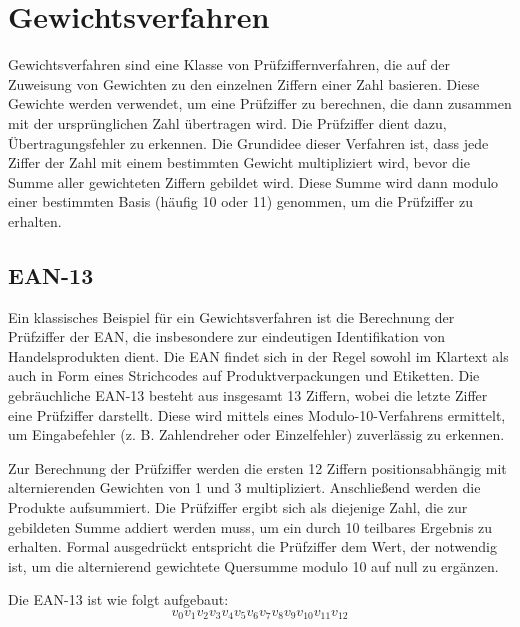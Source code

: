 
\chapter{Gewichtsverfahren}
\label{chap:Gewichtsverfahren}

Gewichtsverfahren sind eine Klasse von Prüfziffernverfahren, die auf der Zuweisung von Gewichten zu den einzelnen Ziffern einer Zahl basieren. Diese Gewichte werden verwendet, um eine Prüfziffer zu berechnen, die dann zusammen mit der ursprünglichen Zahl übertragen wird. Die Prüfziffer dient dazu, Übertragungsfehler zu erkennen.
Die Grundidee dieser Verfahren ist, dass jede Ziffer der Zahl mit einem bestimmten Gewicht multipliziert wird, bevor die Summe aller gewichteten Ziffern gebildet wird. Diese Summe wird dann modulo einer bestimmten Basis (häufig 10 oder 11) genommen, um die Prüfziffer zu erhalten.

\section{EAN-13}
\label{sec:ean13}

Ein klassisches Beispiel für ein Gewichtsverfahren ist die Berechnung der Prüfziffer der \ac{EAN}, die insbesondere zur eindeutigen Identifikation von Handelsprodukten dient. Die EAN findet sich in der Regel sowohl im Klartext als auch in Form eines Strichcodes auf Produktverpackungen und Etiketten. Die gebräuchliche EAN-13 besteht aus insgesamt 13 Ziffern, wobei die letzte Ziffer eine Prüfziffer darstellt. Diese wird mittels eines Modulo-10-Verfahrens ermittelt, um Eingabefehler (z. B. Zahlendreher oder Einzelfehler) zuverlässig zu erkennen.

Zur Berechnung der Prüfziffer werden die ersten 12 Ziffern positionsabhängig mit alternierenden Gewichten von 1 und 3 multipliziert. Anschließend werden die Produkte aufsummiert. Die Prüfziffer ergibt sich als diejenige Zahl, die zur gebildeten Summe addiert werden muss, um ein durch 10 teilbares Ergebnis zu erhalten. Formal ausgedrückt entspricht die Prüfziffer dem Wert, der notwendig ist, um die alternierend gewichtete Quersumme modulo 10 auf null zu ergänzen.

Die EAN-13 ist wie folgt aufgebaut:\newline
\begin{equation}
v_0 v_1 v_2 v_3 v_4 v_5 v_6 v_7 v_8 v_9 v_{10} v_{11} v_{12}
\end{equation}


